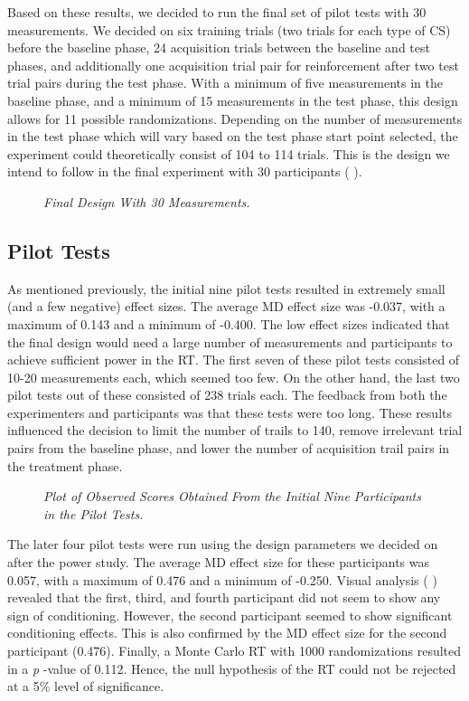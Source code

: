 \documentclass{article}
\begin{document}
Based on these results, we decided to run the final set of pilot tests with 30 measurements. We decided on six training trials (two trials for each type of CS) before the baseline phase, 24 acquisition trials between the baseline and test phases, and additionally one acquisition trial pair for reinforcement after two test trial pairs during the test phase. With a minimum of five measurements in the baseline phase, and a minimum of 15 measurements in the test phase, this design allows for 11 possible randomizations. Depending on the number of measurements in the test phase which will vary based on the test phase start point selected, the experiment could theoretically consist of 104 to 114 trials. This is the design we intend to follow in the final experiment with 30 participants ( \autocite{bibFigure 2} ). 


  \begin{figure}

  \caption{\emph{Final Design With 30 Measurements.} }
\label{Figure 2}
 

\end{figure}
\subsection{Pilot Tests} 

As mentioned previously, the initial nine pilot tests resulted in extremely small (and a few negative) effect sizes. The average MD effect size was -0.037, with a maximum of 0.143 and a minimum of -0.400. The low effect sizes indicated that the final design would need a large number of measurements and participants to achieve sufficient power in the RT. The first seven of these pilot tests consisted of 10-20 measurements each, which seemed too few. On the other hand, the last two pilot tests out of these consisted of 238 trials each. The feedback from both the experimenters and participants was that these tests were too long. These results influenced the decision to limit the number of trails to 140, remove irrelevant trial pairs from the baseline phase, and lower the number of acquisition trail pairs in the treatment phase. 


  \begin{figure}

  \caption{\emph{Plot of Observed Scores Obtained }\emph{From} \emph{the Initial Nine Participants in the Pilot Tests.} }
\label{Figure 3}
 

\end{figure}
The later four pilot tests were run using the design parameters we decided on after the power study. The average MD effect size for these participants was 0.057, with a maximum of 0.476 and a minimum of -0.250. Visual analysis ( \autocite{bibFigure 4} ) revealed that the first, third, and fourth participant did not seem to show any sign of conditioning. However, the second participant seemed to show significant conditioning effects. This is also confirmed by the MD effect size for the second participant (0.476). Finally, a Monte Carlo RT with 1000 randomizations resulted in a \emph{p} -value of 0.112. Hence, the null hypothesis of the RT could not be rejected at a 5\% level of significance. 
\end{document}
